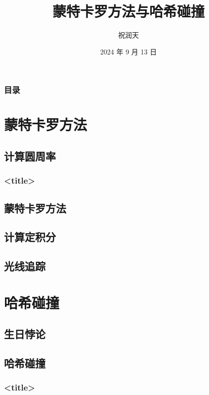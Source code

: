 \documentclass{beamer}
\title{蒙特卡罗方法与哈希碰撞}
\author{祝润天}
\institute{复旦大学计算机科学技术学院}
\date{2024 年 9 月 13 日}
\begin{document}
\begin{frame}
    
    \maketitle

\end{frame}

\begin{frame}
    \frametitle{目录}

    \tableofcontents

\end{frame}

\section{蒙特卡罗方法}

\subsection{计算圆周率}

\begin{frame}
    \frametitle{<title>}

    

\end{frame}

\subsection{蒙特卡罗方法}

\subsection{计算定积分}

\subsection{光线追踪}

\section{哈希碰撞}

\subsection{生日悖论}

\subsection{哈希碰撞}

\begin{frame}
    \frametitle{<title>}

    

\end{frame}
\end{document}
